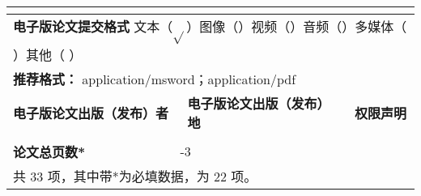 \begin{table}[htbp]
{\begin{tabularx}{1.1\textwidth}{|X|X|X|X|X|}
   & \multicolumn{2}{|l|}{}    & \multicolumn{2}{|l|}{ } \\
\midrule
\multicolumn{5}{|l|}{\textbf{电子版论文提交格式} \quad 文本（$\sqrt{ }$）图像（\quad）视频（\quad）音频（\quad）多媒体（ \quad ）其他（ \quad ）} \\
\multicolumn{5}{|l|}{\textbf{推荐格式：} application/msword；application/pdf} \\
\midrule
\multicolumn{2}{|l|}{\textbf{电子版论文出版（发布）者}  } & \multicolumn{2}{|l|}{\textbf{电子版论文出版（发布）地}  } & \textbf{权限声明} \\ \hline
\multicolumn{2}{|l|}{} & \multicolumn{2}{|l|}{} & \\
\midrule
\textbf{论文总页数*} & \multicolumn{4}{|l|}{\pageref{LastPage}-3} \\ \hline
\multicolumn{5}{|l|}{共 33 项，其中带*为必填数据，为 22 项。} \\
\bottomrule
\end{tabularx}}
\end{table}
